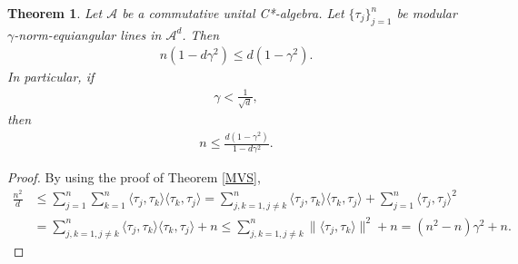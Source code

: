 \documentclass{amsart}
\newtheorem{theorem}{Theorem}[section]
\begin{document}
\begin{theorem} 
Let $\mathcal{A}$ be a commutative unital C*-algebra.	Let $\{\tau_j\}_{j=1}^n$  	be modular  $\gamma$-norm-equiangular  lines in $\mathcal{A}^d$. Then 
		\begin{align*}
		n(1-d\gamma^2) \leq d(1-\gamma^2).
	\end{align*}
	In particular, if 
		\begin{align*}
		\gamma < \frac{1}{\sqrt{d}},
	\end{align*}
	then 
	\begin{align*}
		n\leq \frac{d(1-\gamma^2)}{1-d\gamma^2}.
	\end{align*}
\end{theorem}
\begin{proof}
	By using the proof of Theorem \ref{MVS}, 
	\begin{align*}
		 \frac{n^2}{d}&\leq \sum_{j=1}^n\sum_{k=1}^n\langle \tau_j, \tau_k\rangle \langle \tau_k, \tau_j\rangle = \sum_{j,k=1, j\neq k}^n\langle \tau_j, \tau_k\rangle \langle \tau_k, \tau_j\rangle +\sum_{j=1}^n\langle \tau_j, \tau_j\rangle^2\\
		 &=\sum_{j,k=1, j\neq k}^n\langle \tau_j, \tau_k\rangle \langle \tau_k, \tau_j\rangle +n\leq \sum_{j,k=1, j\neq k}^n\|\langle \tau_j, \tau_k\rangle \|^2 +n=(n^2-n)\gamma^2+n.
	\end{align*}
\end{proof}
\end{document}
